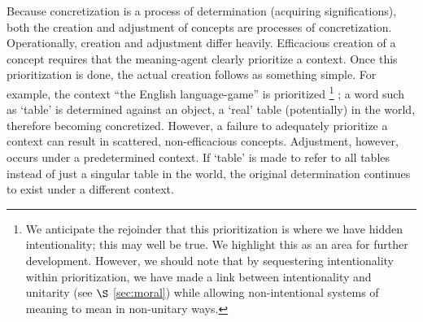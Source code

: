 Because concretization is a process of determination (acquiring significations), both the creation and adjustment of concepts are processes of concretization. Operationally, creation and adjustment differ heavily. Efficacious creation of a concept requires that the meaning-agent clearly prioritize a context. Once this prioritization is done, the actual creation follows as something simple. For example, the context ``the English language-game'' is prioritized
\footnote{We anticipate the rejoinder that this prioritization is where we have hidden intentionality; this may well be true. We highlight this as an area for further development. However, we should note that by sequestering intentionality within prioritization, we have made a link between intentionality and unitarity (see $\S$ \ref{sec:moral}) while allowing non-intentional systems of meaning to mean in non-unitary ways.
}
; a word such as `table' is determined against an object, a `real' table (potentially) in the world, therefore becoming concretized.
However, a failure to adequately prioritize a context can result in scattered, non-efficacious concepts.
Adjustment, however, occurs under a predetermined context. If `table' is made to refer to all tables instead of just a singular table in the world, the original determination continues to exist under a different context.



